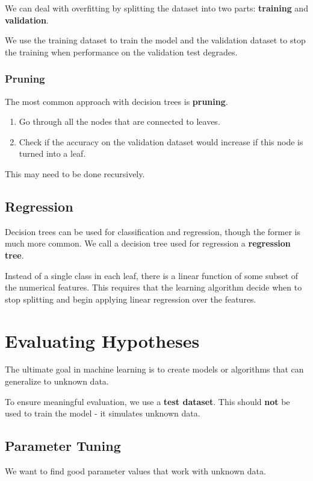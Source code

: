 \documentclass[11pt]{article}
\begin{document}
We can deal with overfitting by splitting the dataset into two parts: \textbf{training} and \textbf{validation}.

We use the training dataset to train the model and the validation dataset to stop the training when performance on the validation test degrades.

\subsubsection{Pruning}
The most common approach with decision trees is \textbf{pruning}.
\begin{enumerate}
  \item Go through all the nodes that are connected to leaves.
  \item Check if the accuracy on the validation dataset would increase if this node is turned into a leaf.
\end{enumerate}
This may need to be done recursively.

\subsection{Regression}
Decision trees can be used for classification and regression, though the former is much more common.
We call a decision tree used for regression a \textbf{regression tree}.

Instead of a single class in each leaf, there is a linear function of some subset of the numerical features.
This requires that the learning algorithm decide when to stop splitting and begin applying linear regression over the features.

\section{Evaluating Hypotheses}
The ultimate goal in machine learning is to create models or algorithms that can generalize to unknown data.

To ensure meaningful evaluation, we use a \textbf{test dataset}.
This should \textbf{not} be used to train the model - it simulates unknown data.

\subsection{Parameter Tuning}
We want to find good parameter values that work with unknown data.
\end{document}
